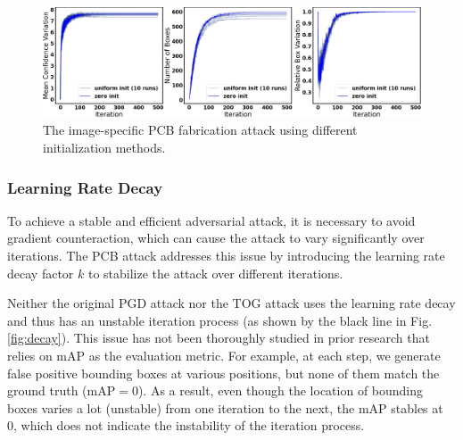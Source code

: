 
\begin{figure}[H]
    \centering
    \includegraphics[width=\textwidth]{figures/chapter_detection/hardware/init.png}
    \caption{The image-specific  PCB fabrication attack using different initialization methods.}
    \label{fig:init}
\end{figure}

\subsubsection{Learning Rate Decay}

To achieve a stable and efficient adversarial attack, it is necessary to avoid gradient counteraction, which can cause the attack to vary significantly over iterations. The PCB attack addresses this issue by introducing the learning rate decay factor $k$ to stabilize the attack over different iterations.

Neither the original PGD attack nor the TOG attack uses the learning rate decay and thus has an unstable iteration process (as shown by the black line in Fig. \ref{fig:decay}). This issue has not been thoroughly studied in prior research that relies on mAP as the evaluation metric. For example, at each step, we generate false positive bounding boxes at various positions, but none of them match the ground truth (mAP$=0$). As a result, even though the location of bounding boxes varies a lot (unstable) from one iteration to the next, the mAP stables at 0, which does not indicate the instability of the iteration process.

